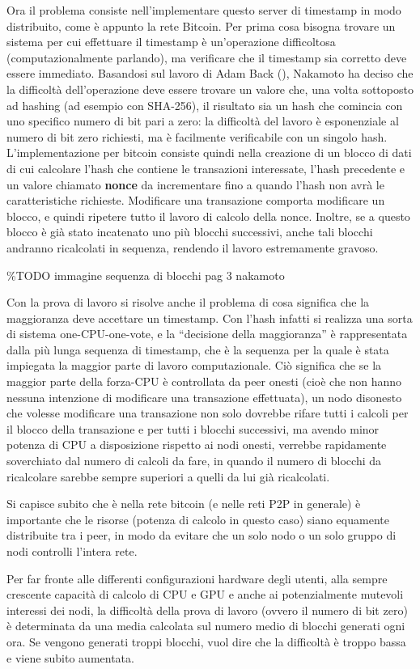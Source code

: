 Ora il problema consiste nell'implementare questo server di timestamp in
modo distribuito, come è appunto la rete Bitcoin. Per prima cosa bisogna
trovare un sistema per cui effettuare il timestamp è un'operazione
difficoltosa (computazionalmente parlando), ma verificare che il
timestamp sia corretto deve essere immediato. Basandosi sul lavoro di
Adam Back (\cite{hashcash}), Nakamoto ha deciso che la difficoltà
dell'operazione deve essere trovare un valore che, una volta sottoposto
ad hashing (ad esempio con SHA-256), il risultato sia un hash che
comincia con uno specifico numero di bit pari a zero: la difficoltà del
lavoro è esponenziale al numero di bit zero richiesti, ma è facilmente
verificabile con un singolo hash. L'implementazione per bitcoin consiste
quindi nella creazione di un blocco di dati di cui calcolare l'hash che
contiene le transazioni interessate, l'hash precedente e un valore
chiamato \textbf{nonce} da incrementare fino a quando l'hash non avrà le
caratteristiche richieste. Modificare una transazione comporta
modificare un blocco, e quindi ripetere tutto il lavoro di calcolo della
nonce. Inoltre, se a questo blocco è già stato incatenato uno più
blocchi successivi, anche tali blocchi andranno ricalcolati in sequenza,
rendendo il lavoro estremamente gravoso.

\%TODO immagine sequenza di blocchi pag 3 nakamoto

Con la prova di lavoro si risolve anche il problema di cosa significa
che la maggioranza deve accettare un timestamp. Con l'hash infatti si
realizza una sorta di sistema one-CPU-one-vote, e la ``decisione della
maggioranza'' è rappresentata dalla più lunga sequenza di timestamp, che
è la sequenza per la quale è stata impiegata la maggior parte di lavoro
computazionale. Ciò significa che se la maggior parte della forza-CPU è
controllata da peer onesti (cioè che non hanno nessuna intenzione di
modificare una transazione effettuata), un nodo disonesto che volesse
modificare una transazione non solo dovrebbe rifare tutti i calcoli per
il blocco della transazione e per tutti i blocchi successivi, ma avendo
minor potenza di CPU a disposizione rispetto ai nodi onesti, verrebbe
rapidamente soverchiato dal numero di calcoli da fare, in quando il
numero di blocchi da ricalcolare sarebbe sempre superiori a quelli da
lui già ricalcolati.

Si capisce subito che è nella rete bitcoin (e nelle reti P2P in
generale) è importante che le risorse (potenza di calcolo in questo
caso) siano equamente distribuite tra i peer, in modo da evitare che un
solo nodo o un solo gruppo di nodi controlli l'intera rete.

Per far fronte alle differenti configurazioni hardware degli utenti,
alla sempre crescente capacità di calcolo di CPU e GPU e anche ai
potenzialmente mutevoli interessi dei nodi, la difficoltà della prova di
lavoro (ovvero il numero di bit zero) è determinata da una media
calcolata sul numero medio di blocchi generati ogni ora. Se vengono
generati troppi blocchi, vuol dire che la difficoltà è troppo bassa e
viene subito aumentata.

